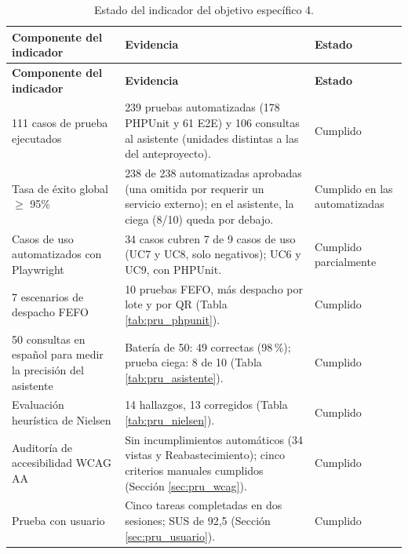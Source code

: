 \begin{longtable}{|p{4.3cm}|p{8.3cm}|p{2.3cm}|}
\caption{Estado del indicador del objetivo específico 4.}
\label{tab:pru_oe4}\\
\hline
\textbf{Componente del indicador} & \textbf{Evidencia} & \textbf{Estado} \\
\hline
\endfirsthead
\hline
\textbf{Componente del indicador} & \textbf{Evidencia} & \textbf{Estado} \\
\hline
\endhead
111 casos de prueba ejecutados & 239 pruebas automatizadas (178 PHPUnit y 61 E2E) y 106 consultas al asistente (unidades distintas a las del anteproyecto). & Cumplido \\ \hline
Tasa de éxito global $\geq$ 95\% & 238 de 238 automatizadas aprobadas (una omitida por requerir un servicio externo); en el asistente, la ciega (8/10) queda por debajo. & Cumplido en las automatizadas \\ \hline
Casos de uso automatizados con Playwright & 34 casos cubren 7 de 9 casos de uso (UC7 y UC8, solo negativos); UC6 y UC9, con PHPUnit. & Cumplido parcialmente \\ \hline
7 escenarios de despacho FEFO & 10 pruebas FEFO, más despacho por lote y por QR (Tabla \ref{tab:pru_phpunit}). & Cumplido \\ \hline
50 consultas en español para medir la precisión del asistente & Batería de 50: 49 correctas (98\,\%); prueba ciega: 8 de 10 (Tabla \ref{tab:pru_asistente}). & Cumplido \\ \hline
Evaluación heurística de Nielsen & 14 hallazgos, 13 corregidos (Tabla \ref{tab:pru_nielsen}). & Cumplido \\ \hline
Auditoría de accesibilidad WCAG AA & Sin incumplimientos automáticos (34 vistas y Reabastecimiento); cinco criterios manuales cumplidos (Sección \ref{sec:pru_wcag}). & Cumplido \\ \hline
Prueba con usuario & Cinco tareas completadas en dos sesiones; SUS de 92,5 (Sección \ref{sec:pru_usuario}). & Cumplido \\ \hline
\end{longtable}
